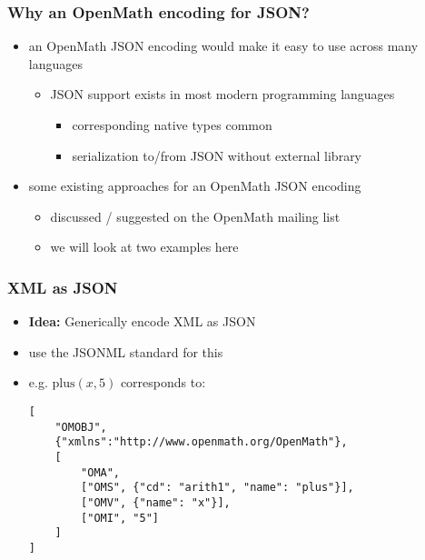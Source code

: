 \documentclass[usenames,dvipsnames]{beamer}
\begin{document}
\begin{frame}
    \frametitle{Why an OpenMath encoding for JSON?}
    \begin{itemize}
        \item an OpenMath JSON encoding would make it easy to use across many languages
        \begin{itemize}
            \item JSON support exists in most modern programming languages
            \begin{itemize}
                \item corresponding native types common
                \item serialization to/from JSON without external library
            \end{itemize}
        \end{itemize}
        \item some existing approaches for an OpenMath JSON encoding
        \begin{itemize}
            \item discussed / suggested on the OpenMath mailing list
            \item we will look at two examples here
        \end{itemize}
    \end{itemize}
\end{frame}

\begin{frame}[fragile]
    \frametitle{XML as JSON}
    \begin{itemize}
        \item \textbf{Idea:} Generically encode XML as JSON
        \item use the JSONML standard for this%
        \item e.g. $\mathrm{plus}(x, 5)$ corresponds to:
\begin{lstlisting}
[
    "OMOBJ",
    {"xmlns":"http://www.openmath.org/OpenMath"},
    [
        "OMA",
        ["OMS", {"cd": "arith1", "name": "plus"}],
        ["OMV", {"name": "x"}],
        ["OMI", "5"]
    ]
]
\end{lstlisting}
    \end{itemize}
\end{frame}
\end{document}
